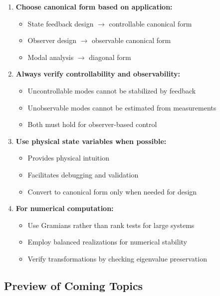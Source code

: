 \begin{enumerate}
    \item \textbf{Choose canonical form based on application:}
    \begin{itemize}
        \item State feedback design $\rightarrow$ controllable canonical form
        \item Observer design $\rightarrow$ observable canonical form
        \item Modal analysis $\rightarrow$ diagonal form
    \end{itemize}

    \item \textbf{Always verify controllability and observability:}
    \begin{itemize}
        \item Uncontrollable modes cannot be stabilized by feedback
        \item Unobservable modes cannot be estimated from measurements
        \item Both must hold for observer-based control
    \end{itemize}

    \item \textbf{Use physical state variables when possible:}
    \begin{itemize}
        \item Provides physical intuition
        \item Facilitates debugging and validation
        \item Convert to canonical form only when needed for design
    \end{itemize}

    \item \textbf{For numerical computation:}
    \begin{itemize}
        \item Use Gramians rather than rank tests for large systems
        \item Employ balanced realizations for numerical stability
        \item Verify transformations by checking eigenvalue preservation
    \end{itemize}
\end{enumerate}

\subsection{Preview of Coming Topics}

